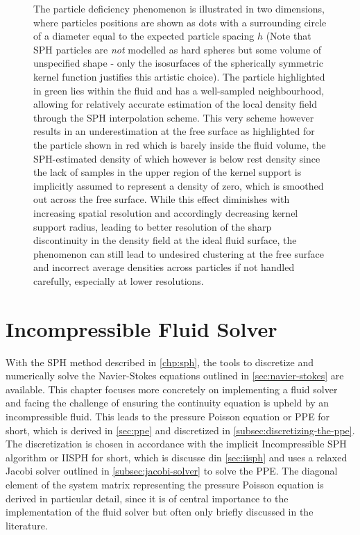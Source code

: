 \documentclass[oneside, a4paper]{book}
\begin{document}
  \begin{figure}
    \centering
    \caption{The particle deficiency phenomenon is illustrated in two dimensions, where particles positions are shown as dots with a surrounding circle of a diameter equal to the expected particle spacing $h$ (Note that SPH particles are \textit{not} modelled as hard spheres but some volume of unspecified shape - only the isosurfaces of the spherically symmetric kernel function justifies this artistic choice). The particle highlighted in green lies within the fluid and has a well-sampled neighbourhood, allowing for relatively accurate estimation of the local density field through the SPH interpolation scheme. This very scheme however results in an underestimation at the free surface as highlighted for the particle shown in red which is barely inside the fluid volume, the SPH-estimated density of which however is below rest density since the lack of samples in the upper region of the kernel support is implicitly assumed to represent a density of zero, which is smoothed out across the free surface. While this effect diminishes with increasing spatial resolution and accordingly decreasing kernel support radius, leading to better resolution of the sharp discontinuity in the density field at the ideal fluid surface, the phenomenon can still lead to undesired clustering at the free surface and incorrect average densities across particles if not handled carefully, especially at lower resolutions.}
    \label{fig:particle-deficiency}
  \end{figure}
    


\chapter{Incompressible Fluid Solver}\label{chp:fluid}
  With the SPH method described in \autoref{chp:sph}, the tools to discretize and numerically solve the Navier-Stokes equations outlined in \autoref{sec:navier-stokes} are available. This chapter focuses more concretely on implementing a fluid solver and facing the challenge of ensuring the continuity equation is upheld by an incompressible fluid. This leads to the pressure Poisson equation or PPE for short, which is derived in \autoref{sec:ppe} and discretized in \autoref{subsec:discretizing-the-ppe}. The discretization is chosen in accordance with the implicit Incompressible SPH algorithm or IISPH for short, which is discusse din \autoref{sec:iisph} and uses a relaxed Jacobi solver outlined in \autoref{subsec:jacobi-solver} to solve the PPE. The diagonal element of the system matrix representing the pressure Poisson equation is derived in particular detail, since it is of central importance to the implementation of the fluid solver but often only briefly discussed in the literature.
  
\end{document}
